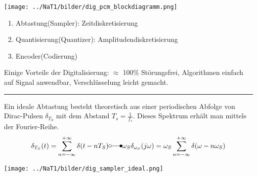 
\begin{center}
	\texttt{[image: ../NaT1/bilder/dig\_pcm\_blockdiagramm.png]}
\end{center}
\begin{enumerate}
  \item Abtastung(Sampler): Zeitdiskretisierung 
  \item Quantisierung(Quantizer): Amplitudendiskretisierung
  \item Encoder(Codierung)
\end{enumerate}

Einige Vorteile der Digitalisierung: $\approx$ 100\% Störungsfrei, Algorithmen
einfach auf Signal anwendbar, Verschlüsselung leicht gemacht.\\

\hrule
{}
Ein ideale Abtastung besteht theoretisch aus einer periodischen Abfolge von Dirac-Pulsen
$\delta_{T_S}$ mit dem Abstand $T_s = \frac{1}{f_s}$. Dieses Spektrum erhält man mittels der
Fourier-Reihe. \\ 
$$ \delta_{T_S}(t) = \sum\limits_{n=-\infty}^{+\infty} \delta(t-nT_S) \laplace 
\omega_S \delta_{\omega_S} (j \omega) = 
\omega_S \sum\limits_{n=-\infty}^{+\infty} \delta(\omega - n \omega_S)$$
	\begin{center}
		\texttt{[image: ../NaT1/bilder/dig\_sampler\_ideal.png]}
	\end{center}

